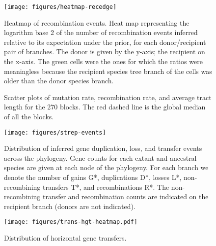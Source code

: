\documentclass[english]{article}
\newcommand{\lyxdot}{.}
\begin{document}
\begin{figure}
\texttt{[image: figures/heatmap-recedge]}
\caption{\label{fig:Heatmap-of-recombination}Heatmap of recombination events.
Heat map representing the logarithm base 2 of the number of recombination
events inferred relative to its expectation under the prior, for each
donor/recipient pair of branches. The donor is given by the y-axis;
the recipient on the x-axis.  The
green cells were the ones for which the ratios were meaningless because
the recipient species tree branch of the cells was older than the
donor species branch.}
\end{figure}
\clearpage{}%

\begin{figure}


\caption{\label{fig:scatter3}Scatter plots of mutation rate, recombination
rate, and average tract length for the 270 blocks. The red dashed
line is the global median of all the blocks.}
\end{figure}
\clearpage{}%


\begin{figure}
\texttt{[image: figures/strep-events]}
\caption{\label{fig:Gene-duplication-loss} Distribution of inferred
  gene duplication, loss, and transfer events across the phylogeny.
  Gene counts for each extant and ancestral species are given at each
  node of the phylogeny.  For each branch we denote the number of gains
  G*, duplications D*, losses L*, non-recombining transfers T*, and 
  recombinations R*.  The non-recombining transfer and recombination counts
  are indicated on the recipient branch (donors are not indicated).}
\end{figure}
\clearpage{}%

\begin{figure}
\begin{center}
\texttt{[image: figures/trans-hgt-heatmap.pdf]}
\end{center}
\vspace{-1.2in}
\caption{Distribution of horizontal gene transfers.}
\label{fig:hgt-heatmap}
\end{figure}
\end{document}
